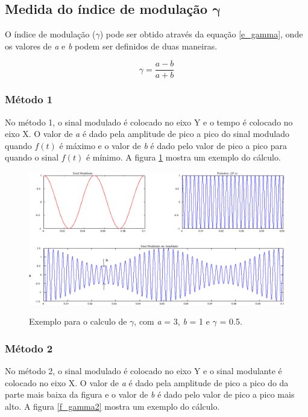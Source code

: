 \subsection{Medida do índice de modulação $\bm{\gamma}$}
O índice de modulação ($\gamma$) pode ser obtido através da equação \ref{e_gamma}, onde os valores de \textit{a} e \textit{b} podem ser definidos de duas maneiras.

\begin{equation}
\gamma = \frac{a - b}{a + b}
\label{e_gamma}
\end{equation}

\subsubsection{Método 1}
No método 1, o sinal modulado é colocado no eixo Y e o tempo é colocado no eixo X. O valor de \textit{a} é dado pela amplitude de pico a pico do sinal modulado quando $f(t)$ é máximo e o valor de \textit{b} é dado pelo valor de pico a pico para quando o sinal  $f(t)$ é mínimo. A figura \ref{f_gamma1} mostra um exemplo do cálculo.

\begin{figure}[H]
\centering
\caption{Exemplo para o calculo de $\gamma$, com \textit{a} = 3, \textit{b} = 1 e $\gamma$ = 0.5.}
\includegraphics[scale=0.4]{Imagens/gamma1.png}
\label{f_gamma1}
\end{figure}

\subsubsection{Método 2}

No método 2, o sinal modulado é colocado no eixo Y e o sinal modulante é colocado no eixo X. O valor de \textit{a} é dado pela amplitude de pico a pico do da parte mais baixa da figura e o valor de \textit{b} é dado pelo valor de pico a pico mais alto. A figura \ref{f_gamma2} mostra um exemplo do cálculo.

